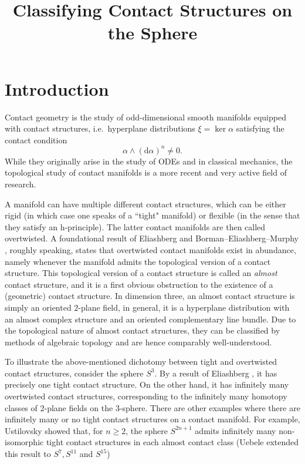 \documentclass[a4paper]{amsart}
\renewcommand*{\d}{\mathrm{d}}
\begin{document}
\title{Classifying Contact Structures on the Sphere}
\address{}
\date{}

\maketitle
\section*{Introduction}
Contact geometry is the study of odd-dimensional smooth manifolds equipped with contact structures, i.e.\ hyperplane distributions $\xi = \ker \alpha$ satisfying the contact condition
\[
    \alpha \wedge (\d \alpha)^n \neq 0.
\]
While they originally arise in the study of ODEs and in classical mechanics, the topological study of contact manifolds is a more recent and very active field of research.

A manifold can have multiple different contact structures, which can be either rigid (in which case one speaks of a ``tight" manifold) or flexible (in the sense that they satisfy an h-principle). The latter contact manifolds are then called overtwisted. A foundational result of Eliashberg \cite{Eliashberg89} and Borman--Eliashberg--Murphy \cite{BEM15}, roughly speaking, states that overtwisted contact manifolds exist in abundance, namely whenever the manifold admits the topological version of a contact structure.
This topological version of a contact structure is called an \emph{almost} contact structure, and it is a first obvious obstruction to the existence of a (geometric) contact structure. 
In dimension three, an almost contact structure is simply an oriented $2$-plane field,
in general, it is a hyperplane distribution with an almost complex structure
and an oriented complementary line bundle.
Due to the topological nature of almost contact structures, they can be classified
by methods of algebraic topology and are hence comparably well-understood.

To illustrate the above-mentioned dichotomy between tight and overtwisted contact structures, consider the sphere $S^3$. By a result of Eliashberg \cite{Eliashberg92}, it has precisely one tight contact structure. On the other hand, it has infinitely many overtwisted contact structures, corresponding to the infinitely many homotopy classes of 2-plane fields on the 3-sphere. There are other examples where there are infinitely many or no tight contact structures on a contact manifold.
For example, Ustilovsky \cite{Ustilovsky99} showed that, for $n \geq 2$, the sphere 
$S^{2n+1}$ admits infinitely many non-isomorphic tight contact structures in each almost 
contact class (Uebele \cite{Uebele16} extended this result to $S^7, S^{11}$ and $S^{15}$)
\end{document}
